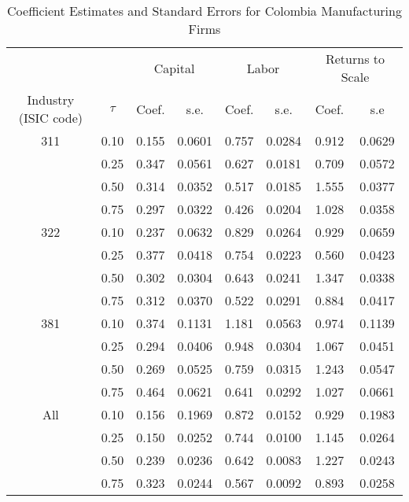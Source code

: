 \begin{table}[ht]
\centering
\caption{Coefficient Estimates and Standard Errors for Colombia Manufacturing Firms} 
\begin{tabular}{cccccccc}
  \hline\hline & & \multicolumn{2}{c}{Capital}  & \multicolumn{2}{c}{Labor} & \multicolumn{2}{c}{Returns to Scale} \\ \cmidrule(lr){3-4} \cmidrule(lr){5-6} \cmidrule(lr){7-8}Industry (ISIC code) & $\tau$ & Coef. & s.e. & Coef. & s.e. & Coef. & s.e \\ 
  \hline
311 & 0.10 & 0.155 & 0.0601 & 0.757 & 0.0284 & 0.912 & 0.0629 \\ 
   & 0.25 & 0.347 & 0.0561 & 0.627 & 0.0181 & 0.709 & 0.0572 \\ 
   & 0.50 & 0.314 & 0.0352 & 0.517 & 0.0185 & 1.555 & 0.0377 \\ 
   & 0.75 & 0.297 & 0.0322 & 0.426 & 0.0204 & 1.028 & 0.0358 \\ 
  322 & 0.10 & 0.237 & 0.0632 & 0.829 & 0.0264 & 0.929 & 0.0659 \\ 
   & 0.25 & 0.377 & 0.0418 & 0.754 & 0.0223 & 0.560 & 0.0423 \\ 
   & 0.50 & 0.302 & 0.0304 & 0.643 & 0.0241 & 1.347 & 0.0338 \\ 
   & 0.75 & 0.312 & 0.0370 & 0.522 & 0.0291 & 0.884 & 0.0417 \\ 
  381 & 0.10 & 0.374 & 0.1131 & 1.181 & 0.0563 & 0.974 & 0.1139 \\ 
   & 0.25 & 0.294 & 0.0406 & 0.948 & 0.0304 & 1.067 & 0.0451 \\ 
   & 0.50 & 0.269 & 0.0525 & 0.759 & 0.0315 & 1.243 & 0.0547 \\ 
   & 0.75 & 0.464 & 0.0621 & 0.641 & 0.0292 & 1.027 & 0.0661 \\ 
  All & 0.10 & 0.156 & 0.1969 & 0.872 & 0.0152 & 0.929 & 0.1983 \\ 
   & 0.25 & 0.150 & 0.0252 & 0.744 & 0.0100 & 1.145 & 0.0264 \\ 
   & 0.50 & 0.239 & 0.0236 & 0.642 & 0.0083 & 1.227 & 0.0243 \\ 
   & 0.75 & 0.323 & 0.0244 & 0.567 & 0.0092 & 0.893 & 0.0258 \\ 
   \hline
\end{tabular}
\end{table}
